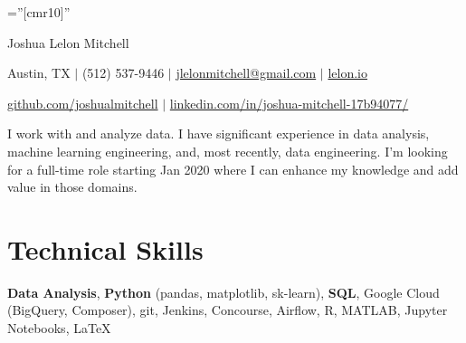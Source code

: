 \documentclass[a4paper,10pt]{article}
\begin{document}
	
	
	\pagestyle{empty} %
	
	\font\fb=''[cmr10]'' %
	
	\par{\centering
		{\Huge Joshua Lelon Mitchell
		}\par}
	\par{\centering
		{
			Austin, TX
			$\mid$
			(512) 537-9446
			$\mid$
			\href {mailto:jlelonmitchell@gmail.com}{jlelonmitchell@gmail.com}
			$\mid$
			\href {https://lelon.io/}{lelon.io}
			
			\href {https://github.com/joshualmitchell}{github.com/joshualmitchell}
			$\mid$
			\href {https://www.linkedin.com/in/joshua-mitchell-17b94077/}{linkedin.com/in/joshua-mitchell-17b94077/}
		}\par}
	
	\begin{center}
		I work with and analyze data. I have significant experience in data analysis, machine learning engineering, and, most recently, data engineering. I'm looking for a full-time role starting Jan 2020 where I can enhance my knowledge and add value in those domains.
	\end{center}
	\section{Technical Skills}
	
	\textbf{Data Analysis}, \textbf{Python} (pandas, matplotlib, sk-learn), \textbf{SQL}, Google Cloud (BigQuery, Composer), git, Jenkins, Concourse, Airflow, R, MATLAB, Jupyter Notebooks, LaTeX
	
\end{document}
